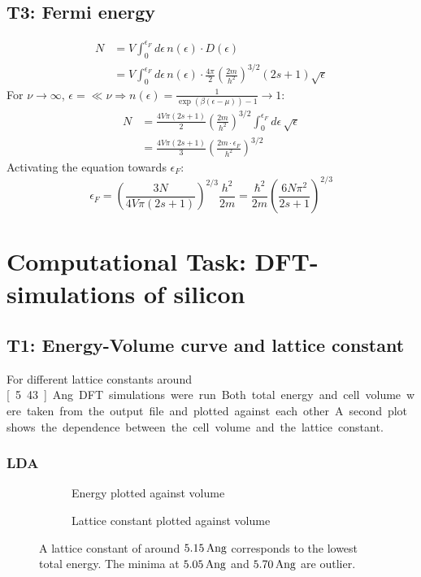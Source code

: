 \documentclass[12pt,a4paper]{scrartcl}
\begin{document}
\subsection{T3: Fermi energy}
\begin{align*}
N &= V \int_0^{\epsilon_F} d\epsilon \, n(\epsilon) \cdot D(\epsilon) \\
&= V \int_0^{\epsilon_F} d\epsilon \, n(\epsilon) \cdot \frac{4\pi}{2} \left(\frac{2m}{h^2}\right)^{3/2} (2s+1) \sqrt{\epsilon}
\end{align*}
For $\nu \rightarrow \infty$, $\epsilon = \ll \nu \Rightarrow n(\epsilon) = \frac{1}{\exp\left(\beta(\epsilon-\mu)\right)-1} \rightarrow 1$:
\begin{align*}
N &= \frac{4V\pi(2s+1)}{2} \left(\frac{2m}{h^2}\right)^{3/2} \int_0^{\epsilon_F} d\epsilon \, \sqrt{\epsilon} \\
&= \frac{4V\pi(2s+1)}{3} \left(\frac{2m\cdot \epsilon_F}{h^2}\right)^{3/2}
\end{align*}
Activating the equation towards $\epsilon_F$:
\begin{equation}
\epsilon_F = \left(\frac{3N}{4V\pi(2s+1)}\right)^{2/3} \frac{h^2}{2m} = \frac{\hbar^2}{2m} \left(\frac{6N\pi^2}{2s+1}\right)^{2/3}
\end{equation}

\section{Computational Task: DFT- simulations of silicon}

\subsection{T1: Energy-Volume curve and lattice constant}

For different lattice constants around \unit[5.43]{Ang} DFT simulations were run. Both total energy and cell volume were taken from the output file and plotted against each other. A second plot shows the dependence between the cell volume and the lattice constant.

\subsubsection{LDA}

\begin{figure}[H]
        \begin{subfigure}[a]{\textwidth}
			\resizebox{\linewidth}{!}{}
    		\caption[LDA: energy against volume]{Energy plotted against volume}
		\end{subfigure}
        \begin{subfigure}[a]{\textwidth}
			\resizebox{\linewidth}{!}{}
    		\caption[LDA: lattice constant against volume]{Lattice constant plotted against volume}
		\end{subfigure}
        \caption[Plots to determine the lowest energy lattice constant (LDA)]{A lattice constant of around $\unit[5.15]{Ang}$ corresponds to the lowest total energy. The minima at $\unit[5.05]{Ang}$ and $\unit[5.70]{Ang}$ are outlier.}
        \label{fig:latticeLDA}
\end{figure}
\end{document}
